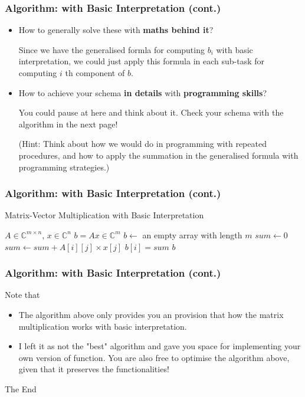 \documentclass{beamer}
\begin{document}
\begin{frame}
    \frametitle{Algorithm: with Basic Interpretation (cont.)}
    \begin{itemize}
        \item How to generally solve these with \textbf{maths behind it}?\medskip
        
        \noindent Since we have the generalised formla for computing \(b_{i}\) with basic interpretation, we could just apply this formula in each sub-task for computing \(i\) th component of \(b\). 
        \item How to achieve your schema \textbf{in details} with \textbf{programming skills}? \medskip
        
        \noindent You could pause at here and think about it. Check your schema with the algorithm in the next page! \medskip
        
        \noindent (Hint: Think about how we would do in programming with repeated procedures, and how to apply the summation in the generalised formula with programming strategies.)
    \end{itemize}
\end{frame}
\begin{frame}
    \frametitle{Algorithm: with Basic Interpretation (cont.)}
    \begin{algorithm}[H]
        \caption{Matrix-Vector Multiplication with Basic Interpretation}\label{alg:cap}
        \begin{algorithmic}
        \Require \(A \in \mathbb{C}^{m \times n}\), \(x \in \mathbb{C}^{n}\)
        \Ensure \(b = Ax \in \mathbb{C}^{m}\)
        \State \(b \gets\) an empty array with length \(m\)
            \State \( sum \gets 0\) 
                \State \(sum \gets sum + A[i][j] \times x[j]\) 
            \EndFor
            \State \(b[i] = sum\) 
        \EndFor
        \State \Return \(b\) 
        \end{algorithmic}
    \end{algorithm}
\end{frame}

\begin{frame}
    \frametitle{Algorithm: with Basic Interpretation (cont.)}
    Note that
    \begin{itemize}
        \item The algorithm above only provides you an provision that how the matrix multiplication works with basic interpretation. 
        \item I left it as not the "best" algorithm and gave you space for implementing your own version of function. You are also free to optimise the algorithm above, given that it preserves the functionalities!
    \end{itemize}
\end{frame}

\begin{frame}
\Huge{\centerline{The End}}
\end{frame}

\end{document}
